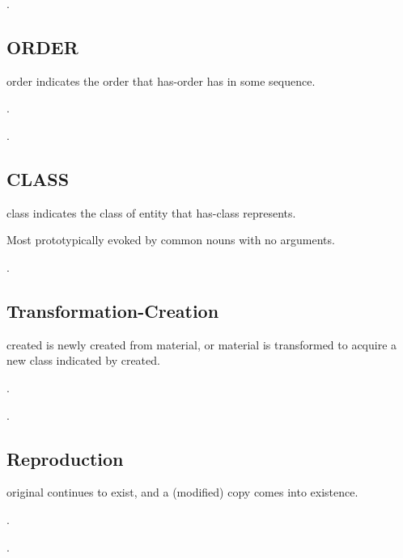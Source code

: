 \documentclass[a4paper]{article}
\newcommand{\fr}[1]{\textsf{#1}}
\newcommand{\rl}[1]{\textsf{#1}}
\begin{document}
\ex.

\subsection{\fr{ORDER}}
\label{sec:ORDER}

\rl{order} indicates the order that \rl{has-order} has in some sequence.

\ex.

\ex.

\subsection{\fr{CLASS}}
\label{sec:CLASS}

\rl{class} indicates the class of entity that \rl{has-class} represents.

Most prototypically evoked by common nouns with no arguments.

\ex.

\subsection{\fr{Transformation-Creation}}
\label{sec:Transformation-Creation}

\rl{created} is newly created from \rl{material}, or \rl{material} is
transformed to acquire a new class indicated by \rl{created}.

\ex.

\ex.

\subsection{\fr{Reproduction}}
\label{sec:Reproduction}

\rl{original} continues to exist, and a (modified) \rl{copy} comes into existence.

\ex.

\ex.

%
%
%
\end{document}
